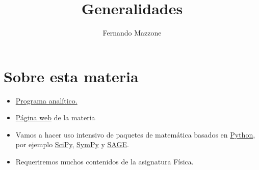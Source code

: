 \documentclass{article}
\title{Generalidades}
\author{Fernando Mazzone}
\begin{document}
  \maketitle
\tableofcontents


















\section{Sobre esta materia}

\begin{itemize}
 \item  \href{https://docs.google.com/viewer?a=v&pid=sites&srcid=ZGVmYXVsdGRvbWFpbnxlY3VhY2lvbmVzZGlmZXJlbmNpYWxldW5yY3xneDoyZjE0YzJmMDcyODc0ZGQ3}{Programa analítico.}
 \item  \href{https://sites.google.com/site/ecuacionesdiferencialeunrc/ecuaciones-diferenciales-unrc}{Página web} de la materia
 \item  Vamos a hacer uso intensivo de paquetes de matemática basados en \href{https://www.python.org/}{Python}, por ejemplo \href{http://www.scipy.org/}{SciPy},  \href{http://www.scipy.org/}{SymPy} y \href{http://www.sagemath.org/}{SAGE}.
 \item  Requeriremos muchos contenidos de la asignatura Física.

\end{itemize}
\end{document}
